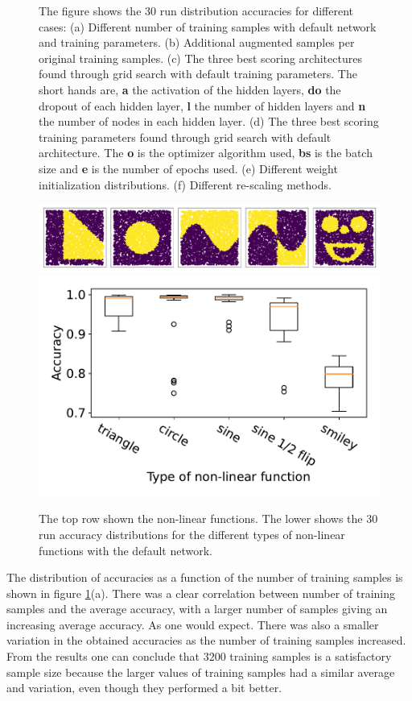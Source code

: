 \documentclass[prl,twocolumn]{revtex4-1}
\begin{document}
\begin{figure}[!tb]
  \caption{The figure shows the 30 run distribution accuracies for different cases:
  (a) Different number of training samples with default network and training parameters. (b) Additional augmented samples per original training samples. (c) The three best scoring architectures found through grid search with default training parameters. The short hands are, \textbf{a} the activation of the hidden layers, \textbf{do} the dropout of each hidden layer, \textbf{l} the number of hidden layers and \textbf{n} the number of nodes in each hidden layer. (d) The three best scoring training parameters found through grid search with default architecture. The \textbf{o} is the optimizer algorithm used, \textbf{bs} is the batch size and \textbf{e} is the number of epochs used. (e) Different weight initialization distributions. (f) Different re-scaling methods.}
  \label{fig:all}
\end{figure}


\begin{figure}[!tb]
  \includegraphics[width = \figwidth]{task_1/figures/non_linear_functions_2.pdf}
  \vskip 0.5mm
  \includegraphics[width=\figwidth]{task_1/figures/types_box_30_2.pdf}
  \caption{The top row shown the non-linear functions. The lower shows the 30 run accuracy distributions for the different types of non-linear functions with the default network.}
  \label{fig:non-linear_functions}
\end{figure}
The distribution of accuracies as a function of the number of training samples is shown in figure \ref{fig:all}(a). There was a clear correlation between number of training samples and the average accuracy, with a larger number of samples giving an increasing average accuracy. As one would expect. There was also a smaller variation in the obtained accuracies as the number of training samples increased. From the results one can conclude that $3200$ training samples is a satisfactory sample size because the larger values of training samples had a similar average and variation, even though they performed a bit better.
\end{document}
